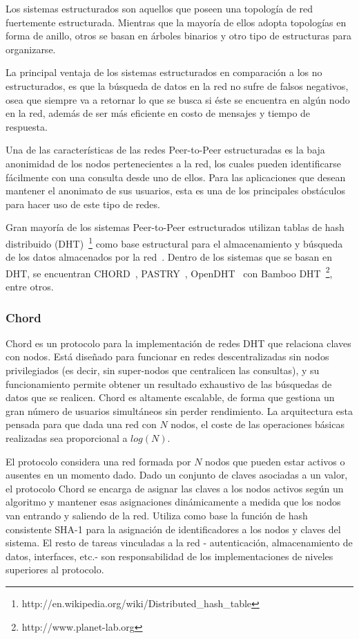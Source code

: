 Los sistemas estructurados son aquellos que poseen una topología de red
fuertemente estructurada. Mientras que la mayoría de ellos adopta topologías en
forma de anillo, otros se basan en árboles binarios y otro tipo de estructuras
para organizarse.

La principal ventaja de los sistemas estructurados en comparación a los no
estructurados, es que la búsqueda de datos en la red no sufre de falsos
negativos, osea que siempre va a retornar lo
que se busca si éste se encuentra en algún nodo en la red, además de ser más eficiente en
costo de mensajes y tiempo de respuesta.

Una de las características de las redes Peer-to-Peer estructuradas es la baja
anonimidad de los nodos pertenecientes a la red, los cuales pueden
identificarse fácilmente con una consulta desde uno de ellos. Para las
aplicaciones que desean mantener el anonimato de sus usuarios, esta es una de
los principales obstáculos para hacer uso de este tipo de redes.

Gran mayoría de los sistemas Peer-to-Peer estructurados utilizan tablas de hash
distribuido (DHT)~\footnote{http://en.wikipedia.org/wiki/Distributed\_hash\_table}
como base estructural para el almacenamiento y búsqueda de los datos
almacenados por la red~\cite{BalakrishnanEtAl03}. Dentro de los sistemas que se basan en DHT, se
encuentran 
CHORD~\cite{conf:hotos:DabekBKKMSB01},
PASTRY~\cite{oai:CiteSeerPSU:441779},
OpenDHT~\cite{Rhea:2005:OPD:1080091.1080102} con Bamboo
DHT~\footnote{http://www.planet-lab.org},
entre otros.

\subsubsection{Chord}
\label{sec:chord}

Chord es un protocolo para la implementación de redes DHT que relaciona claves con nodos. Está diseñado para
funcionar en redes descentralizadas sin nodos privilegiados (es decir, sin super-nodos
que centralicen las consultas), y su funcionamiento permite obtener un resultado exhaustivo de
las búsquedas de datos que se realicen. Chord es altamente escalable, de forma que
gestiona un gran número de usuarios simultáneos sin perder rendimiento. La arquitectura
esta pensada para que dada una red con $N$ nodos, el coste de las operaciones básicas
realizadas sea proporcional a $log(N)$.

El protocolo considera una red formada por $N$ nodos que pueden estar activos o
ausentes en un momento dado. Dado un conjunto de claves
asociadas a un valor, el protocolo Chord se encarga de asignar las claves a los
nodos activos según un algoritmo y mantener esas asignaciones dinámicamente a medida
que los nodos van entrando y saliendo de la red. Utiliza como base la función
de hash consistente SHA-1 para la asignación de identificadores a los nodos y
claves del sistema.
El resto de tareas vinculadas a la red - autenticación, almacenamiento de
datos, interfaces, etc.- son responsabilidad de los implementaciones de niveles
superiores al protocolo.

